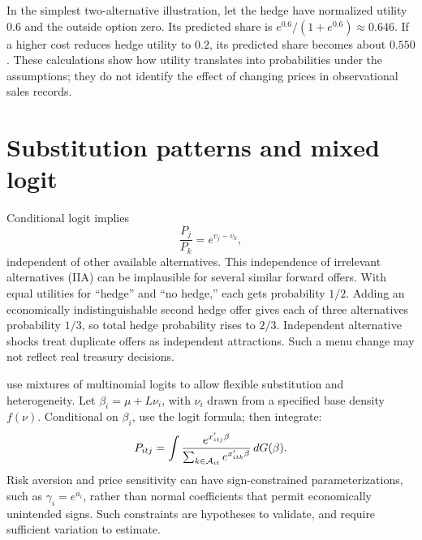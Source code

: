 In the simplest two-alternative illustration, let the hedge have normalized utility $0.6$ and the outside option zero. Its predicted share is $e^{0.6}/(1+e^{0.6})\approx0.646$. If a higher cost reduces hedge utility to $0.2$, its predicted share becomes about $0.550$. These calculations show how utility translates into probabilities under the assumptions; they do not identify the effect of changing prices in observational sales records.

\section{Substitution patterns and mixed logit}
Conditional logit implies
\begin{equation}
\frac{P_j}{P_k}=e^{v_j-v_k},
\end{equation}
independent of other available alternatives. This independence of irrelevant alternatives (IIA) can be implausible for several similar forward offers. With equal utilities for ``hedge'' and ``no hedge,'' each gets probability $1/2$. Adding an economically indistinguishable second hedge offer gives each of three alternatives probability $1/3$, so total hedge probability rises to $2/3$. Independent alternative shocks treat duplicate offers as independent attractions. Such a menu change may not reflect real treasury decisions.

\citet[Sections I--III]{mcfadden2000} use mixtures of multinomial logits to allow flexible substitution and heterogeneity. Let $\beta_i=\mu+L\nu_i$, with $\nu_i$ drawn from a specified base density $f(\nu)$. Conditional on $\beta_i$, use the logit formula; then integrate:
\begin{equation}
P_{itj}=\int
\frac{e^{x_{itj}'\beta}}{\sum_{k\in\mathcal A_{it}}e^{x_{itk}'\beta}}
\,dG(\beta).
\label{eq:mixedlogit}
\end{equation}
Risk aversion and price sensitivity can have sign-constrained parameterizations, such as $\gamma_i=e^{a_i}$, rather than normal coefficients that permit economically unintended signs. Such constraints are hypotheses to validate, and require sufficient variation to estimate.

